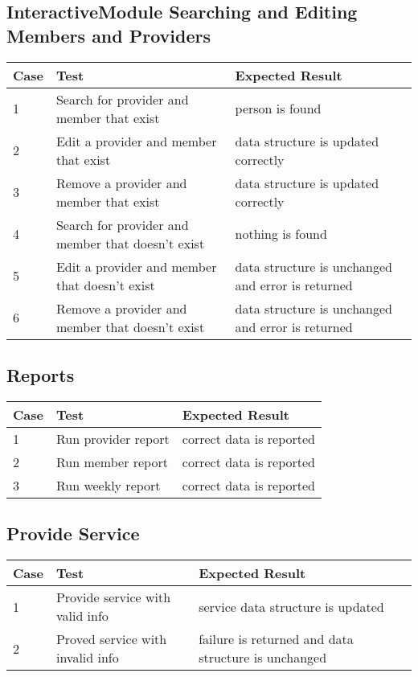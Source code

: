 \documentclass{article}
\begin{document}
\subsection{InteractiveModule Searching and Editing Members and Providers}
\begin{tabular}{ |l|l|l| }
   \hline
   Case  &              Test           &     Expected Result   \\
   \hline
   \hline
   1     &     Search for provider and member that exist   &   person is found    \\
   \hline
   2     &    Edit a provider and member that exist    &  data structure is updated correctly \\
   \hline
   3     &   Remove a provider and member that exist  &    data structure is updated correctly \\
   \hline
   4     &     Search for provider and member that doesn't exist   &   nothing is found    \\
   \hline
   5     &    Edit a provider and member that doesn't exist    &  data structure is unchanged and error is returned \\
   \hline
   6     &   Remove a provider and member that doesn't exist  &    data structure is unchanged and error is returned \\
   \hline
\end{tabular}

\subsection{Reports}
\begin{tabular}{ |l|l|l| }
   \hline
   Case  &              Test           &     Expected Result    \\
   \hline
   \hline
   1     &    Run provider report & correct data is reported  \\
   \hline
   2     &   Run member report &  correct data is reported  \\
   \hline
   3     &   Run weekly report & correct data is reported  \\
   \hline
\end{tabular}

\subsection{Provide Service}
\begin{tabular}{ |l|l|l| }
   \hline
   Case  &              Test           &     Expected Result      \\
   \hline
   \hline
   1     &   Provide service with valid info & service data structure is updated  \\
   \hline
   2     &  Proved service with invalid info & failure is returned and data structure is unchanged \\
   \hline
\end{tabular}
\end{document}
